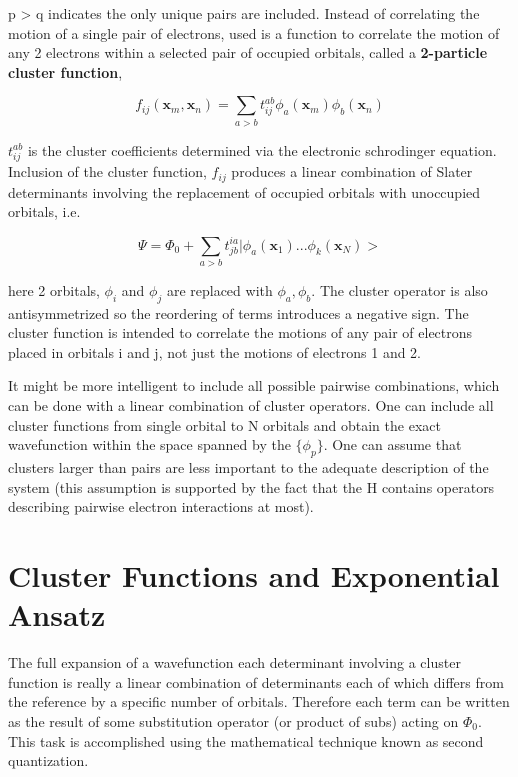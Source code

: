\documentclass[10pt, draft]{article}
\begin{document}
p > q indicates the only unique pairs are included.  Instead of correlating the motion of a single pair of electrons, used is a function to correlate the motion of any 2 electrons within a selected pair of occupied orbitals, called a \textbf{2-particle cluster function}, 

\[f_{ij}(\textbf{x}_m, \textbf{x}_n) = \sum_{a>b} t^{ab}_{ij}\phi_a(\textbf{x}_m)\phi_b(\textbf{x}_n)\]

$t^{ab}_{ij}$ is the cluster coefficients determined via the electronic schrodinger equation.  Inclusion of the cluster function, $f_{ij}$ produces a linear combination of Slater determinants involving the replacement of occupied orbitals with unoccupied orbitals, i.e. 

\[\Psi = \Phi_0 + \sum_{a>b} t^{ia}_{jb} |\phi_a(\textbf{x}_1)...\phi_k(\textbf{x}_N)>\] 

here 2 orbitals, $\phi_i$ and $\phi_j$ are replaced with $\phi_a, \phi_b$.  The cluster operator is also antisymmetrized so the reordering of terms introduces a negative sign. The cluster function is intended to correlate the motions of any pair of electrons placed in orbitals i and j, not just the motions of electrons 1 and 2.  \linebreak[1]

It might be more intelligent to include all possible pairwise combinations, which can be done with a linear combination of cluster operators.  One can include all cluster functions from single orbital to N orbitals and obtain the exact wavefunction within the space spanned by the $\{\phi_p\}$. One can assume that clusters larger than pairs are less important to the adequate description of the system (this assumption is supported by the fact that the H contains operators describing pairwise electron interactions at most).  

\section{Cluster Functions and Exponential Ansatz}
The full expansion of a wavefunction each determinant involving a cluster function is really a linear combination of determinants each of which differs from the reference by a specific number of orbitals. Therefore each term can be written as the result of some substitution operator (or product of subs) acting on $\Phi_0$.  This task is accomplished using the mathematical technique known as second quantization.\linebreak[1]
\end{document}
